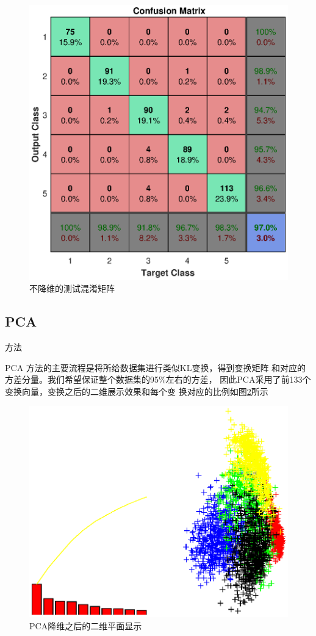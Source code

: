 \documentclass[UTF8,a4paper]{paper}
\begin{document}
\begin{figure}
\centering
\includegraphics[width=\textwidth]{ori.eps}
\caption{不降维的测试混淆矩阵}
\label{fig2}
\end{figure}

\subsection{PCA}方法

PCA 方法的主要流程是将所给数据集进行类似KL变换，得到变换矩阵
和对应的方差分量。我们希望保证整个数据集的95\%左右的方差，
因此PCA采用了前133个变换向量，变换之后的二维展示效果和每个变
换对应的比例如图\ref{fig3}所示

\begin{figure}
\centering
\includegraphics[width=\textwidth]{pca.eps}
\caption{PCA降维之后的二维平面显示}
\label{fig3}
\end{figure}
\end{document}
